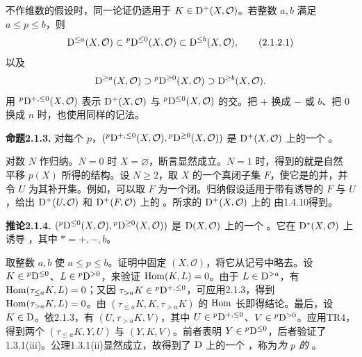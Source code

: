不作维数的假设时，同一论证仍适用于 $K\in\mathrm{D}^+(X,\mathcal O)$。若整数 $a,b$ 满足 $a\leq p\leq b$，则
\begin{equation*}
 \mathrm{D}^{\leq a}(X,\mathcal O)\subset{}^p\mathrm{D}^{\leq0}(X,\mathcal O)
 \subset\mathrm{D}^{\leq b}(X,\mathcal O),\tag{2.1.2.1}
\end{equation*}
以及
\[
 \mathrm{D}^{\geq a}(X,\mathcal O)\supset{}^p\mathrm{D}^{\geq0}(X,\mathcal O)
 \supset\mathrm{D}^{\geq b}(X,\mathcal O).
\]
用 ${}^p\mathrm{D}^{+,\leq0}(X,\mathcal O)$ 表示 $\mathrm{D}^+(X,\mathcal O)$ 与 ${}^p\mathrm{D}^{\leq0}(X,\mathcal O)$ 的交。把 $+$ 换成 $-$ 或 $b$、把 $0$ 换成 $n$ 时，也使用同样的记法。

\par\medskip\noindent\textbf{命题2.1.3.} 对每个 $p$，$({}^p\mathrm{D}^{+,\leq0}(X,\mathcal O),{}^p\mathrm{D}^{\geq0}(X,\mathcal O))$ 是 $\mathrm{D}^+(X,\mathcal O)$ 上的一个 。

对数 $N$ 作归纳。$N=0$ 时 $X=\varnothing$，断言显然成立。$N=1$ 时，得到的就是自然 平移 $p(X)$ 所得的结构。设 $N\geq2$，取 $X$ 的一个真闭子集 $F$，使它是的并，并令 $U$ 为其补开集。例如，可以取 $F$ 为一个闭。归纳假设适用于带有诱导的 $F$ 与 $U$，给出 $\mathrm{D}^+(U,\mathcal O)$ 和 $\mathrm{D}^+(F,\mathcal O)$ 上的 。所求的 $\mathrm{D}^+(X,\mathcal O)$ 上的 由1.4.10得到。

\par\medskip\noindent\textbf{推论2.1.4.} $({}^p\mathrm{D}^{\leq0}(X,\mathcal O),{}^p\mathrm{D}^{\geq0}(X,\mathcal O))$ 是 $\mathrm{D}(X,\mathcal O)$ 上的一个 。它在 $\mathrm{D}^*(X,\mathcal O)$ 上诱导 ，其中 $*=+,-,b$。

取整数 $a,b$ 使 $a\leq p\leq b$。证明中固定 $(X,\mathcal O)$，将它从记号中略去。设 $K\in{}^p\mathrm{D}^{\leq0}$、$L\in{}^p\mathrm{D}^{>0}$，来验证 $\operatorname{Hom}(K,L)=0$。由于 $L\in\mathrm{D}^{>a}$，有 $\operatorname{Hom}(\tau_{\leq a}K,L)=0$；又因 $\tau_{>a}K\in{}^p\mathrm{D}^{+,\leq0}$，可应用2.1.3，得到 $\operatorname{Hom}(\tau_{>a}K,L)=0$。由 $(\tau_{\leq a}K,K,\tau_{>a}K)$ 的 $\operatorname{Hom}$ 长即得结论。最后，设 $K\in\mathrm{D}$。依2.1.3，有 $(U,\tau_{>a}K,V)$，其中 $U\in{}^p\mathrm{D}^{+,\leq0}$、$V\in{}^p\mathrm{D}^{>0}$。应用TR4，得到两个 $(\tau_{\leq a}K,Y,U)$ 与 $(Y,K,V)$。前者表明 $Y\in{}^p\mathrm{D}^{\leq0}$，后者验证了1.3.1(iii)。公理1.3.1(ii)显然成立，故得到了 $\mathrm{D}$ 上的一个 ，称为\emph{为 $p$ 的 }。


